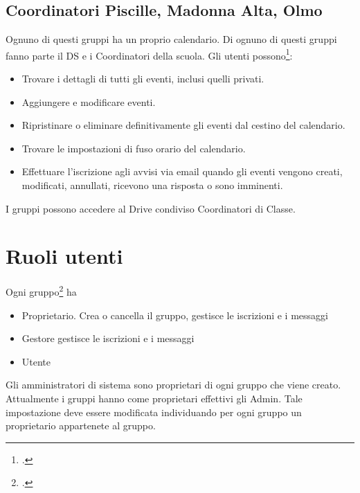 \subsection{Coordinatori Piscille, Madonna Alta, Olmo}
Ognuno di questi gruppi ha un proprio calendario. Di ognuno di questi gruppi fanno parte il DS e i Coordinatori della scuola. Gli utenti possono\footcite{Google2023g}:
\begin{itemize}
	\item Trovare i dettagli di tutti gli eventi, inclusi quelli privati.
	\item Aggiungere e modificare eventi.
	\item Ripristinare o eliminare definitivamente gli eventi dal cestino del calendario.
	\item Trovare le impostazioni di fuso orario del calendario.
	\item Effettuare l'iscrizione agli avvisi via email quando gli eventi vengono creati, modificati, annullati, ricevono una risposta o sono imminenti.
\end{itemize}

I gruppi possono accedere al Drive condiviso Coordinatori di Classe.
\section{Ruoli utenti}
Ogni gruppo\footcite{Google2023e} ha 
\begin{itemize}
	\item Proprietario. Crea o cancella il gruppo, gestisce le iscrizioni e i messaggi 
	\item Gestore gestisce le iscrizioni e i messaggi
	\item Utente
\end{itemize}
Gli amministratori di sistema sono proprietari di ogni gruppo che viene creato. Attualmente i gruppi hanno come proprietari effettivi gli Admin. Tale impostazione deve essere modificata individuando per ogni gruppo un proprietario appartenete al gruppo.